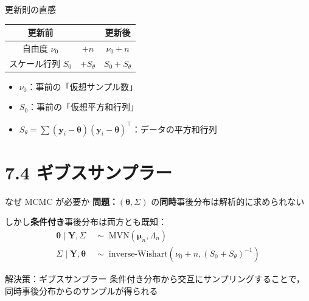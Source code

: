 \documentclass[lualatex,aspectratio=169,12pt]{beamer}
\newcommand{\mvn}{\mathrm{MVN}}
\newcommand{\IW}{\mathrm{inverse\text{-}Wishart}}
\begin{document}
\begin{frame}{更新則の直感}
  \begin{center}
  \renewcommand{\arraystretch}{1.8}
  \begin{tabular}{ccc}
  \toprule
  更新前 & & 更新後 \\
  \midrule
  自由度 $\nu_0$ & $+ n$ & $\nu_0 + n$ \\
  スケール行列 $S_0$ & $+ S_\theta$ & $S_0 + S_\theta$ \\
  \bottomrule
  \end{tabular}
  \end{center}

  \bigskip
  \begin{itemize}
    \item $\nu_0$：事前の「仮想サンプル数」
    \item $S_0$：事前の「仮想平方和行列」
    \item $S_\theta = \sum(\bm{y}_i-\bm{\theta})(\bm{y}_i-\bm{\theta})^\top$：データの平方和行列
  \end{itemize}
\end{frame}

\section{7.4 ギブスサンプラー}

\begin{frame}{なぜ MCMC が必要か}
  \textbf{問題：}$(\bm{\theta}, \Sigma)$ の\textbf{同時}事後分布は解析的に求められない

  \bigskip
  しかし\textbf{条件付き}事後分布は両方とも既知：
  \begin{align*}
    \bm{\theta} \mid \bm{Y}, \Sigma &\;\sim\; \mvn(\bm{\mu}_n, \Lambda_n) \\
    \Sigma \mid \bm{Y}, \bm{\theta} &\;\sim\; \IW(\nu_0+n, (S_0+S_\theta)^{-1})
  \end{align*}

  \bigskip
  \begin{block}{解決策：ギブスサンプラー}
    条件付き分布から交互にサンプリングすることで，
    同時事後分布からのサンプルが得られる
  \end{block}
\end{frame}
\end{document}
